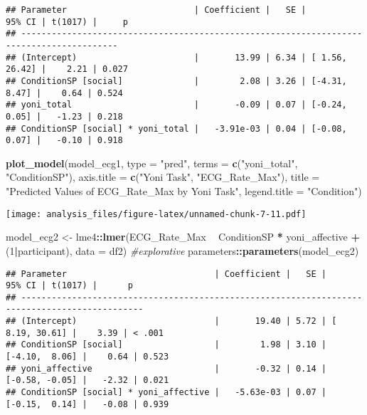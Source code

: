 \documentclass[
]{article}
\newenvironment{Shaded}{\begin{snugshade}}{\end{snugshade}}
\newcommand{\CommentTok}[1]{\textcolor[rgb]{0.56,0.35,0.01}{\textit{#1}}}
\newcommand{\DataTypeTok}[1]{\textcolor[rgb]{0.13,0.29,0.53}{#1}}
\newcommand{\DecValTok}[1]{\textcolor[rgb]{0.00,0.00,0.81}{#1}}
\newcommand{\KeywordTok}[1]{\textcolor[rgb]{0.13,0.29,0.53}{\textbf{#1}}}
\newcommand{\NormalTok}[1]{#1}
\newcommand{\OperatorTok}[1]{\textcolor[rgb]{0.81,0.36,0.00}{\textbf{#1}}}
\newcommand{\StringTok}[1]{\textcolor[rgb]{0.31,0.60,0.02}{#1}}
\begin{document}
\begin{verbatim}
## Parameter                         | Coefficient |   SE |         95% CI | t(1017) |     p
## -----------------------------------------------------------------------------------------
## (Intercept)                       |       13.99 | 6.34 | [ 1.56, 26.42] |    2.21 | 0.027
## ConditionSP [social]              |        2.08 | 3.26 | [-4.31,  8.47] |    0.64 | 0.524
## yoni_total                        |       -0.09 | 0.07 | [-0.24,  0.05] |   -1.23 | 0.218
## ConditionSP [social] * yoni_total |   -3.91e-03 | 0.04 | [-0.08,  0.07] |   -0.10 | 0.918
\end{verbatim}

\begin{Shaded}
\begin{Highlighting}[]
\KeywordTok{plot_model}\NormalTok{(model_ecg1, }\DataTypeTok{type =} \StringTok{"pred"}\NormalTok{, }\DataTypeTok{terms =} \KeywordTok{c}\NormalTok{(}\StringTok{"yoni_total"}\NormalTok{, }\StringTok{"ConditionSP"}\NormalTok{), }\DataTypeTok{axis.title =} \KeywordTok{c}\NormalTok{(}\StringTok{"Yoni Task"}\NormalTok{, }\StringTok{"ECG_Rate_Max"}\NormalTok{), }\DataTypeTok{title =} \StringTok{"Predicted Values of ECG_Rate_Max by Yoni Task"}\NormalTok{, }\DataTypeTok{legend.title =} \StringTok{"Condition"}\NormalTok{)}
\end{Highlighting}
\end{Shaded}

\texttt{[image: analysis\_files/figure-latex/unnamed-chunk-7-11.pdf]}

\begin{Shaded}
\begin{Highlighting}[]
\NormalTok{model_ecg2 <-}\StringTok{ }\NormalTok{lme4}\OperatorTok{::}\KeywordTok{lmer}\NormalTok{(ECG_Rate_Max }\OperatorTok{~}\StringTok{ }\NormalTok{ConditionSP }\OperatorTok{*}\StringTok{ }\NormalTok{yoni_affective }\OperatorTok{+}\StringTok{ }\NormalTok{(}\DecValTok{1}\OperatorTok{|}\NormalTok{participant), }\DataTypeTok{data =}\NormalTok{ df2)  }\CommentTok{#explorative}
\NormalTok{parameters}\OperatorTok{::}\KeywordTok{parameters}\NormalTok{(model_ecg2)}
\end{Highlighting}
\end{Shaded}

\begin{verbatim}
## Parameter                             | Coefficient |   SE |         95% CI | t(1017) |      p
## ----------------------------------------------------------------------------------------------
## (Intercept)                           |       19.40 | 5.72 | [ 8.19, 30.61] |    3.39 | < .001
## ConditionSP [social]                  |        1.98 | 3.10 | [-4.10,  8.06] |    0.64 | 0.523 
## yoni_affective                        |       -0.32 | 0.14 | [-0.58, -0.05] |   -2.32 | 0.021 
## ConditionSP [social] * yoni_affective |   -5.63e-03 | 0.07 | [-0.15,  0.14] |   -0.08 | 0.939
\end{verbatim}
\end{document}
